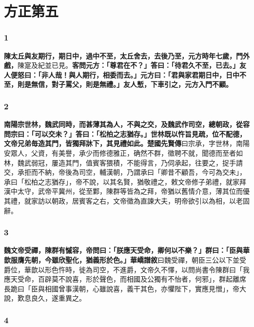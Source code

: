 \chapter{方正第五}

\subsection*{1}

\textbf{陳太丘與友期行，期日中，過中不至，太丘舍去，去後乃至，元方時年七歲，門外戲，}{\footnotesize 陳寔及紀並已見。}\textbf{客問元方：「尊君在不？」答曰：「待君久不至，已去。」友人便怒曰：「非人哉！與人期行，相委而去。」元方曰：「君與家君期日中，日中不至，則是無信，對子罵父，則是無禮。」友人慙，下車引之，元方入門不顧。}

\subsection*{2}

\textbf{南陽宗世林，魏武同時，而甚薄其為人，不與之交，及魏武作司空，總朝政，從容問宗曰：「可以交未？」答曰：「松柏之志猶存。」世林既以忤旨見疏，位不配德，文帝兄弟毎造其門，皆獨拜牀下，其見禮如此。}{\footnotesize \textbf{楚國先賢傳}曰宗承，字世林，南陽安眾人，父資，有美譽，承少而修德雅正，确然不群，徵聘不就，聞德而至者如林，魏武弱冠，屢造其門，值賓客猥積，不能得言，乃伺承起，往要之，捉手請交，承拒而不納，帝後為司空，輔漢朝，乃謂承曰「卿昔不顧吾，今可為交未」，承曰「松柏之志猶存」，帝不說，以其名賢，猶敬禮之，敕文帝修子弟禮，就家拜漢中太守，武帝平冀州，從至鄴，陳群等皆為之拜，帝猶以舊情介意，薄其位而優其禮，就家訪以朝政，居賓客之右，文帝徵為直諫大夫，明帝欲引以為相，以老固辭。}

\subsection*{3}

\textbf{魏文帝受禪，陳群有慽容，帝問曰：「朕應天受命，卿何以不樂？」群曰：「臣與華歆服膺先朝，今雖欣聖化，猶義形於色。」}{\footnotesize \textbf{華嶠譜敘}曰魏受禪，朝臣三公以下並受爵位，華歆以形色忤時，徙為司空，不進爵，文帝久不懌，以問尚書令陳群曰「我應天受命，百辟莫不說喜，形於聲色，而相國及公獨有不怡者，何邪」，群起離席長跪曰「臣與相國曾事漢朝，心雖說喜，義干其色，亦懼陛下，實應見憎」，帝大說，歎息良久，遂重異之。}

\subsection*{4}

